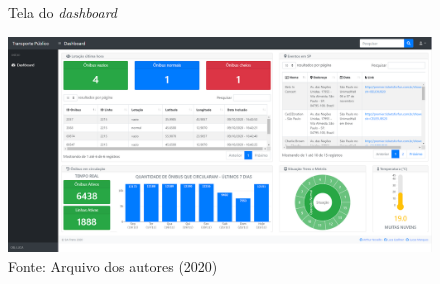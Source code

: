 \begin{figure}[H]
    \centering
    \caption{Tela do \textit{dashboard}}
    \includegraphics[width=1.0\linewidth]{Imagens/dashboard1.png}
    \caption*{Fonte: Arquivo dos autores (2020)}
    \label{telaDashboard1}
\end{figure}
\indent











